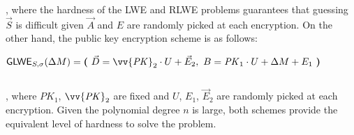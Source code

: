 $ $

, where the hardness of the LWE and RLWE problems guarantees that guessing $\vec{S}$ is difficult given $\vec{A}$ and $E$ are randomly picked at each encryption. On the other hand, the public key encryption scheme is as follows: 

$\textsf{GLWE}_{S, \sigma}(\Delta M) = \bm{(} \text{ } \vec{D} = \vv{{\mathit{PK}}}_2 \cdot U + \vec{E}_2, \text{ } B = \mathit{PK}_1\cdot U + \Delta  M + E_1 \text{ } \bm{)}$

$ $

, where $\mathit{PK}_1$, $\vv{\mathit{PK}}_2$ are fixed and $U$, $E_1$, $\vec{E}_2$ are randomly picked at each encryption. Given the polynomial degree $n$ is large, both schemes provide the equivalent level of hardness to solve the problem. 